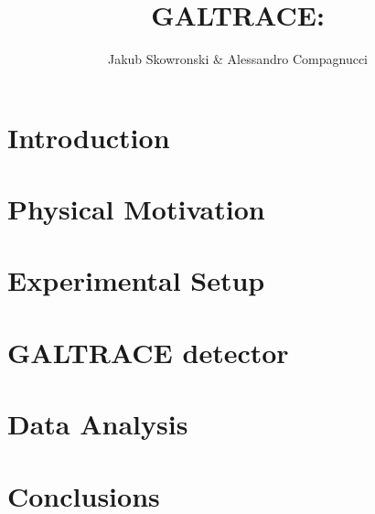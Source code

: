 \documentclass[a4paper, 11pt]{article}
\author{Jakub Skowronski \& Alessandro Compagnucci}
\title{GALTRACE: }
\begin{document}
\maketitle

\clearpage

\tableofcontents

\clearpage

\section{Introduction}



\clearpage

\section{Physical Motivation}



\clearpage

\section{Experimental Setup}



\clearpage

\section{GALTRACE detector}



\clearpage

\section{Data Analysis}



\clearpage

\section{Conclusions}



\clearpage


\end{document}
